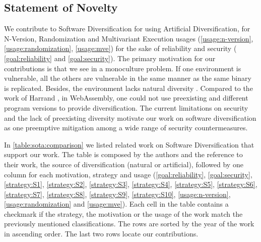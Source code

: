 




\subsection*{Statement of Novelty}


We contribute to Software Diversification for \wasm using Artificial Diversification, for N-Version, Randomization and Multivariant Execution usages (\autoref{usage:n-version}, \autoref{usage:randomization}, \autoref{usage:mve}) for the sake of reliability and security ( \autoref{goal:reliability} and \autoref{goal:security}). 
The primary motivation for our contributions is that we see in \wasm a monoculture problem. If one environment is vulnerable, all the others are vulnerable in the same manner as the same \wasm binary is replicated. 
Besides, the \wasm environment lacks natural diversity \cite{natural_diversity}. Compared to the work of Harrand \etal \citationneeded, in WebAssembly, one could not use preexisting and different program versions to provide diversification. The current limitations on security and the lack of preexisting diversity motivate our work on software diversification as one preemptive mitigation among a wide range of security countermeasures. 


In \autoref{table:sota:comparison} we listed related work on Software Diversification that support our work. The table is composed by the authors and the reference to their work, the source of diversification (natural or artificial), followed by one column for each motivation, strategy and usage (\autoref{goal:reliability},  \autoref{goal:security},  \autoref{strategy:S1},  \autoref{strategy:S2},  \autoref{strategy:S3},  \autoref{strategy:S4},  \autoref{strategy:S5},  \autoref{strategy:S6},  \autoref{strategy:S7},  \autoref{strategy:S8},  \autoref{strategy:S9}, \autoref{strategy:S10}, \autoref{usage:n-version}, \autoref{usage:randomization} and \autoref{usage:mve}). Each cell in the table contains a checkmark if the strategy, the motivation or the usage of the work match the previously mentioned classifications. The rows are sorted by the year of the work in ascending order. The last two rows locate our contributions. 

